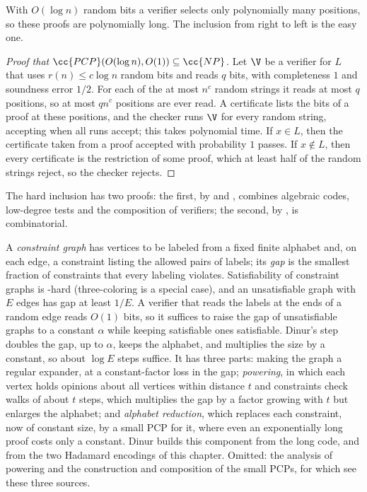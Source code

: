 \begin{refsection}
With $O(\log n)$ random bits a verifier selects only polynomially many positions, so these proofs are polynomially long. The inclusion from right to left is the easy one.

\begin{proof}[Proof that $\cc{PCP}(O(\log n),O(1))\subseteq\cc{NP}$]
Let $\V$ be a verifier for $L$ that uses $r(n)\le c\log n$ random bits and reads $q$ bits, with completeness $1$ and soundness error $1/2$. For each of the at most $n^c$ random strings it reads at most $q$ positions, so at most $qn^c$ positions are ever read. A certificate lists the bits of a proof at these positions, and the checker runs $\V$ for every random string, accepting when all runs accept; this takes polynomial time. If $x\in L$, then the certificate taken from a proof accepted with probability $1$ passes. If $x\notin L$, then every certificate is the restriction of some proof, which at least half of the random strings reject, so the checker rejects.
\end{proof}

The hard inclusion has two proofs: the first, by \textcite{AroraSafra1998} and \textcite{AroraEtAl1998}, combines algebraic codes, low-degree tests and the composition of verifiers; the second, by \textcite{Dinur2007}, is combinatorial.

\begin{proofsketch}
A \emph{constraint graph} has vertices to be labeled from a fixed finite alphabet and, on each edge, a constraint listing the allowed pairs of labels; its \emph{gap} is the smallest fraction of constraints that every labeling violates. Satisfiability of constraint graphs is -hard (three-coloring is a special case), and an unsatisfiable graph with $E$ edges has gap at least $1/E$. A verifier that reads the labels at the ends of a random edge reads $O(1)$ bits, so it suffices to raise the gap of unsatisfiable graphs to a constant $\alpha$ while keeping satisfiable ones satisfiable. Dinur's step doubles the gap, up to $\alpha$, keeps the alphabet, and multiplies the size by a constant, so about $\log E$ steps suffice. It has three parts: making the graph a regular expander, at a constant-factor loss in the gap; \emph{powering}, in which each vertex holds opinions about all vertices within distance $t$ and constraints check walks of about $t$ steps, which multiplies the gap by a factor growing with $t$ but enlarges the alphabet; and \emph{alphabet reduction}, which replaces each constraint, now of constant size, by a small PCP for it, where even an exponentially long proof costs only a constant. Dinur builds this component from the long code, \textcite{RadhakrishnanSudan2007} and \textcite[Chapter~22]{AroraBarak2009} from the two Hadamard encodings of this chapter. Omitted: the analysis of powering and the construction and composition of the small PCPs, for which see these three sources.
\end{proofsketch}


\end{refsection}
